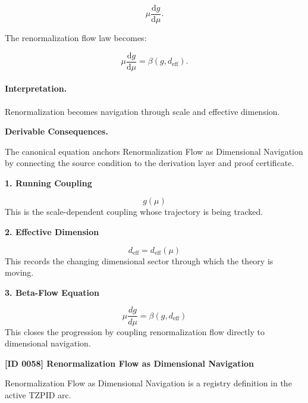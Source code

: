 \begin{equation}
\mu\frac{\mathrm{d}g}{\mathrm{d}\mu}.
\end{equation}

The renormalization flow law becomes:

\begin{equation}
\boxed{
\mu\frac{\mathrm{d}g}{\mathrm{d}\mu}
=
\beta(g,d_{\mathrm{eff}}).
}
\end{equation}

\paragraph{Interpretation.}
Renormalization becomes navigation through scale and effective dimension.

\par\vspace{0.35em}
\noindent\textbf{Derivable Consequences.}\quad
\begingroup
\footnotesize
\raggedright
The canonical equation anchors Renormalization Flow as Dimensional Navigation by connecting the source condition to the derivation layer and proof certificate.
\par\endgroup

\noindent\textbf{1. Running Coupling}\par
\[
g(\mu)
\]
\noindent This is the scale-dependent coupling whose trajectory is being tracked.\par
\noindent\textbf{2. Effective Dimension}\par
\[
d_{\mathrm{eff}} = d_{\mathrm{eff}}(\mu)
\]
\noindent This records the changing dimensional sector through which the theory is moving.\par
\noindent\textbf{3. Beta-Flow Equation}\par
\[
\mu\frac{dg}{d\mu}
=
\beta\!\left(g,d_{\mathrm{eff}}\right)
\]
\noindent This closes the progression by coupling renormalization flow directly to dimensional navigation.\par

\clearpage
\noindent\textbf{[ID 0058] Renormalization Flow as Dimensional Navigation}\par
\vspace{0.35em}
\begingroup\small
{}
Renormalization Flow as Dimensional Navigation is a registry definition in the active TZPID arc.

